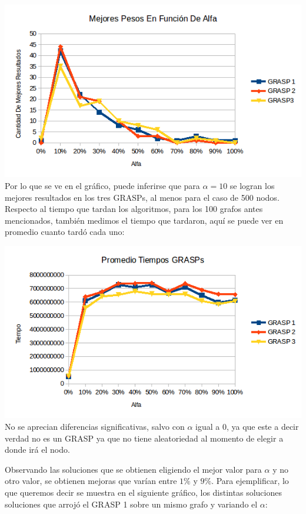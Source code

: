 \includegraphics[scale=0.7]{Ej5/respuestasAlfa1.png}\\

Por lo que se ve en el gráfico, puede inferirse que para $\alpha=10$ se logran los mejores resultados en los tres GRASPs, al menos para el caso de 500 nodos. Respecto al tiempo que tardan los algoritmos, para los 100 grafos antes mencionados, también medimos el tiempo que tardaron, aquí se puede ver en promedio cuanto tardó cada uno:

\includegraphics[scale=0.7]{Ej5/tiemposAlfa.png}\\

No se aprecian diferencias significativas, salvo con $\alpha$ igual a 0, ya que este a decir verdad no es un GRASP ya que no tiene aleatoriedad al momento de elegir a donde irá el nodo.

Observando las soluciones que se obtienen eligiendo el mejor valor para $\alpha$ y no otro valor, se obtienen mejoras que varían entre $1\%$ y $9\%$. Para ejemplificar, lo que queremos decir se muestra en el siguiente gráfico, los distintas soluciones soluciones que arrojó el GRASP 1 sobre un mismo grafo y variando el $\alpha$:

